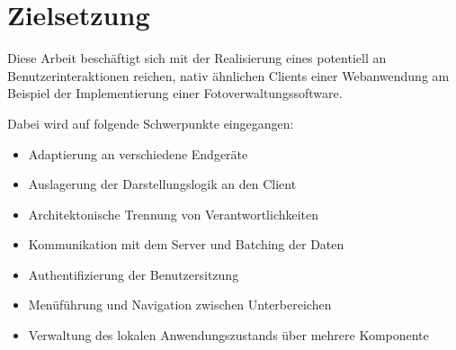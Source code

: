 \newpage

\section{Zielsetzung}
\label{sec:zielsetzung}


Diese Arbeit beschäftigt sich mit der Realisierung eines potentiell an Benutzerinteraktionen reichen, nativ ähnlichen Clients einer Webanwendung am Beispiel der Implementierung einer Fotoverwaltungssoftware.

Dabei wird auf folgende Schwerpunkte eingegangen:
\begin{itemize}
\item Adaptierung an verschiedene Endgeräte
\item Auslagerung der Darstellungslogik an den Client
\item Architektonische Trennung von Verantwortlichkeiten
\item Kommunikation mit dem Server und Batching der Daten
\item Authentifizierung der Benutzersitzung
\item Menüführung und Navigation zwischen Unterbereichen
\item Verwaltung des lokalen Anwendungszustands über mehrere Komponente
\end{itemize}

\newpage
